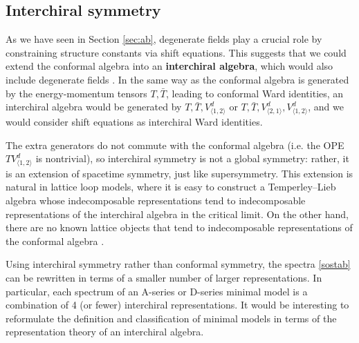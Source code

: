\documentclass[12pt, a4paper]{article}
\newcommand{\myindex}[1]{\textbf{\boldmath #1}}
\begin{document}
\subsection{Interchiral symmetry} \label{sec:icb}

As we have seen in Section \ref{sec:ab}, degenerate fields play a crucial role by constraining structure constants via shift equations. This suggests that we could extend the conformal algebra into an  \myindex{interchiral algebra}, which would also include degenerate fields \cite{grs12}. In the same way as the conformal algebra is generated by the energy-momentum tensors $T,\bar T$, leading to conformal Ward identities, an interchiral algebra would be generated by $T,\bar T,V^d_{\langle 1,2\rangle}$ or $T,\bar T,V^d_{\langle 2,1\rangle},V^d_{\langle 1,2\rangle}$, and we would consider shift equations as interchiral Ward identities.

The extra generators do not commute with the conformal algebra (i.e. the OPE $TV^d_{\langle 1,2\rangle}$ is nontrivial), so interchiral symmetry is not a global symmetry: rather, it is an extension of spacetime symmetry, just like supersymmetry. This extension is natural in lattice loop models, where it is easy to construct a Temperley--Lieb algebra whose indecomposable representations tend to indecomposable representations of the interchiral algebra in the critical limit. On the other hand, there are no known lattice objects that tend to indecomposable representations of the conformal algebra \cite{gjs20}.

Using interchiral symmetry rather than conformal symmetry, the spectra \eqref{sostab} can be rewritten in terms of a smaller number of larger representations. In particular, each spectrum of an A-series or D-series minimal model is a combination of 4 (or fewer) interchiral representations. It would be interesting to reformulate the definition and classification of minimal models in terms of the representation theory of an interchiral algebra.
\end{document}
